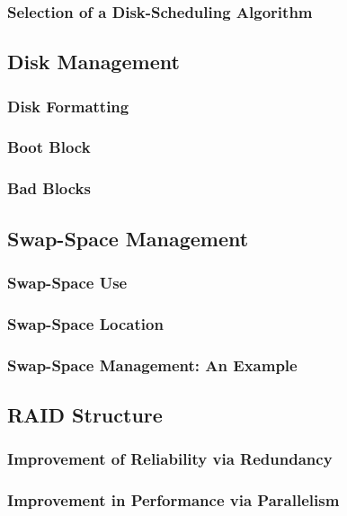 \subsubsection{Selection of a Disk-Scheduling Algorithm}
\subsection{Disk Management}
\subsubsection{Disk Formatting}
\subsubsection{Boot Block}
\subsubsection{Bad Blocks}
\subsection{Swap-Space Management}
\subsubsection{Swap-Space Use}
\subsubsection{Swap-Space Location}
\subsubsection{Swap-Space Management: An Example}
\subsection{RAID Structure}
\subsubsection{Improvement of Reliability via Redundancy}
\subsubsection{Improvement in Performance via Parallelism}
